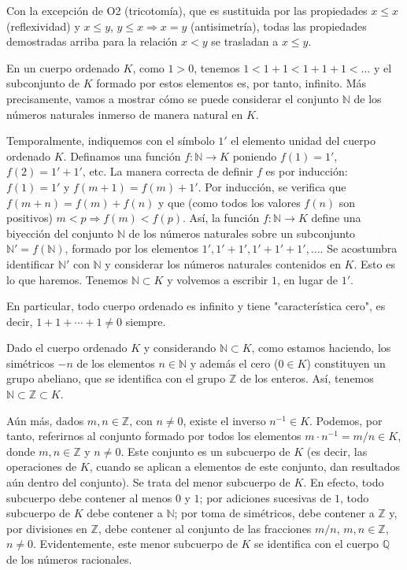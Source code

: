\documentclass[12pt,oneside]{book}
\begin{document}
Con la excepción de O2 (tricotomía), que es sustituida por las propiedades \(x \leq x\) (reflexividad) y \(x \leq y\), \(y \leq x \Rightarrow x = y\) (antisimetría), todas las propiedades demostradas arriba para la relación \(x < y\) se trasladan a \(x \leq y\).

En un cuerpo ordenado \(K\), como \(1 > 0\), tenemos \(1 < 1+1 < 1+1+1 < \ldots\) y el subconjunto de \(K\) formado por estos elementos es, por tanto, infinito. Más precisamente, vamos a mostrar cómo se puede considerar el conjunto \(\mathbb{N}\) de los números naturales inmerso de manera natural en \(K\).

Temporalmente, indiquemos con el símbolo \(1'\) el elemento unidad del cuerpo ordenado \(K\). Definamos una función \(f: \mathbb{N} \to K\) poniendo \(f(1) = 1'\), \(f(2) = 1' + 1'\), etc. La manera correcta de definir \(f\) es por inducción: \(f(1) = 1'\) y \(f(m+1) = f(m) + 1'\). Por inducción, se verifica que \(f(m+n) = f(m) + f(n)\) y que (como todos los valores \(f(n)\) son positivos) \(m < p \Rightarrow f(m) < f(p)\). Así, la función \(f: \mathbb{N} \to K\) define una biyección del conjunto \(\mathbb{N}\) de los números naturales sobre un subconjunto \(\mathbb{N}' = f(\mathbb{N})\), formado por los elementos \(1', 1'+1', 1'+1'+1', \ldots\). Se acostumbra identificar \(\mathbb{N}'\) con \(\mathbb{N}\) y considerar los números naturales contenidos en \(K\). Esto es lo que haremos. Tenemos \(\mathbb{N} \subset K\) y volvemos a escribir \(1\), en lugar de \(1'\).

En particular, todo cuerpo ordenado es infinito y tiene "característica cero", es decir, \(1+1+\cdots+1 \neq 0\) siempre.

Dado el cuerpo ordenado \(K\) y considerando \(\mathbb{N} \subset K\), como estamos haciendo, los simétricos \(-n\) de los elementos \(n \in \mathbb{N}\) y además el cero (\(0 \in K\)) constituyen un grupo abeliano, que se identifica con el grupo \(\mathbb{Z}\) de los enteros. Así, tenemos \(\mathbb{N} \subset \mathbb{Z} \subset K\).

Aún más, dados \(m, n \in \mathbb{Z}\), con \(n \neq 0\), existe el inverso \(n^{-1} \in K\). Podemos, por tanto, referirnos al conjunto formado por todos los elementos \(m \cdot n^{-1} = m/n \in K\), donde \(m, n \in \mathbb{Z}\) y \(n \neq 0\). Este conjunto es un subcuerpo de \(K\) (es decir, las operaciones de \(K\), cuando se aplican a elementos de este conjunto, dan resultados aún dentro del conjunto). Se trata del menor subcuerpo de \(K\). En efecto, todo subcuerpo debe contener al menos \(0\) y \(1\); por adiciones sucesivas de \(1\), todo subcuerpo de \(K\) debe contener a \(\mathbb{N}\); por toma de simétricos, debe contener a \(\mathbb{Z}\) y, por divisiones en \(\mathbb{Z}\), debe contener al conjunto de las fracciones \(m/n\), \(m, n \in \mathbb{Z}\), \(n \neq 0\). Evidentemente, este menor subcuerpo de \(K\) se identifica con el cuerpo \(\mathbb{Q}\) de los números racionales.
\end{document}
